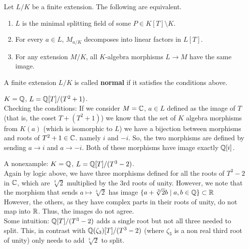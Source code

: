 \begin{prop}
    Let $L / K$ be a finite extension. The following are equivalent.
    \begin{enumerate}
        \item $L$ is the minimal splitting field of some $P \in K[T] \setminus K$.
        \item For every $a \in L$, $M_{a/K}$ decomposes into linear factors in $L[T]$.
        \item For any extension $M/K$, all $K$-algebra morphisms $L \rightarrow M$
        have the same image.
    \end{enumerate}
\end{prop}
\begin{defn}
    A finite extension $L / K$ is called \textbf{normal} if it satisfies the conditions
    above.
\end{defn}
\begin{ex}
    $K = \mathbb{Q}$, $L = \mathbb{Q}[T] / (T^2 + 1)$. \\
    Checking the conditions: If we consider $M = \mathbb{C}$, $a \in L$ defined as the image of $T$
    (that is, the coset $T + (T^2 + 1)$) we know that the set of $K$ algebra morphisms
    from $K(a)$ (which is isomorphic to $L$) we have a bijection between morphisms
    and roots of $T^2 + 1 \in \mathbb{C}$. namely $i$ and $-i$. So, the two
    morphisms are defined by sending $a \rightarrow i$ and $a \rightarrow -i$. Both
    of these morphisms have image exactly $\mathbb{Q}[i]$.
\end{ex}
\begin{ex}
    A nonexample: $K = \mathbb{Q}$, $L = \mathbb{Q}[T] / (T^3 - 2)$. \\
    Again by logic above, we have three morphisms defined for all the
    roots of $T^3 - 2$ in $\mathbb{C}$, which are $\sqrt[3]{2}$ multiplied by the
    3rd roots of unity. However, we note that the morphism that sends
    $a \mapsto \sqrt[3]{2}$ has image $\{a + \sqrt[3]{2}b \mid a, b \in \mathbb{Q}\} \subset \mathbb{R}$ \\
    However, the others, as they have complex parts in their roots of unity, do not
    map into $\mathbb{R}$. Thus, the images do not agree. \\
    Some intuition: $\mathbb{Q}[T] / (T^3 - 2)$ adds a single root but not all three needed
    to split. This, in contrast with $\mathbb{Q}(\zeta_3)[T] / (T^3 - 2)$ (where $\zeta_3$ is a non
    real third root of unity) only needs to add $\sqrt[3]{2}$ to split.
\end{ex}
